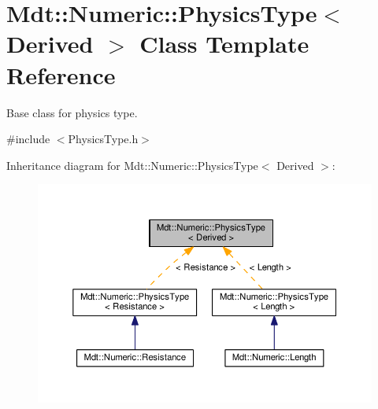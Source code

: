 \hypertarget{class_mdt_1_1_numeric_1_1_physics_type}{}\section{Mdt\+:\+:Numeric\+:\+:Physics\+Type$<$ Derived $>$ Class Template Reference}
\label{class_mdt_1_1_numeric_1_1_physics_type}


Base class for physics type.  




{\ttfamily \#include $<$Physics\+Type.\+h$>$}



Inheritance diagram for Mdt\+:\+:Numeric\+:\+:Physics\+Type$<$ Derived $>$\+:
\nopagebreak
\begin{figure}[H]
\begin{center}
\leavevmode
\includegraphics[width=350pt]{class_mdt_1_1_numeric_1_1_physics_type__inherit__graph}
\end{center}
\end{figure}
